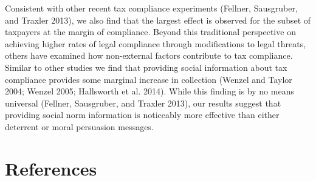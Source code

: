 \documentclass[12pt,titlepage]{article}
\begin{document}
Consistent with other recent tax compliance experiments (Fellner,
Sausgruber, and Traxler 2013), we also find that the largest effect is
observed for the subset of taxpayers at the margin of compliance.
Beyond this traditional perspective on achieving higher rates of legal
compliance through modifications to legal threats, others have
examined how non-external factors contribute to tax
compliance. Similar to other studies we find that providing social
information about tax compliance provides some marginal increase in
collection (Wenzel and Taylor 2004; Wenzel 2005; Hallsworth et
al. 2014). While this finding is by no means universal (Fellner,
Sausgruber, and Traxler 2013), our results suggest that providing
social norm information is noticeably more effective than either
deterrent or moral persuasion messages.

\newpage

\section*{References}
\end{document}

